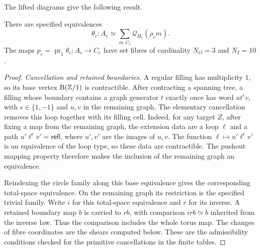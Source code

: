The lifted diagrams give the following result.
\begin{theorem}\label{thm:short-cover}
There are specified equivalences
\[
\theta_c:A_c\simeq\sum_{m:C_c}\mathcal Q_{H_c}(\rho_c m).
\]
The maps $p_c=\operatorname{pr}_1\theta_c:A_c\to C_c$ have set fibres of cardinality $N_O=3$ and $N_I=10$.
\end{theorem}
\begin{proof}
\emph{Cancellation and retained boundaries.}
A regular filling has multiplicity $1$, so its base vertex
$\mathrm B(\mathbb Z/1)$ is contractible. After contracting a spanning tree, a filling
whose boundary contains a graph generator $t$ exactly once has word
$u t^{\epsilon}v$, with $\epsilon\in\{1,-1\}$ and $u,v$ in the remaining graph.
The elementary cancellation removes this loop together with its filling cell.
Indeed, for any target $Z$, after fixing a map from the remaining graph,
the extension data are a loop $\ell$ and a path
$u'\ell^{\epsilon}v'=\mathsf{refl}$, where $u',v'$ are the images of $u,v$.
The function $\ell\mapsto u'\ell^{\epsilon}v'$ is an equivalence of the loop type,
so these data are contractible. The pushout mapping property therefore makes
the inclusion of the remaining graph an equivalence.

Reindexing the circle family along this base equivalence gives the
corresponding total-space equivalence. On the remaining graph its restriction
is the specified trivial family. Write $i$ for this total-space equivalence
and $r$ for its inverse. A retained boundary map $b$ is carried to $r b$,
with comparison $i r b\simeq b$ inherited from the inverse law. Thus the comparison includes the whole
torus map. The changes of fibre coordinates are the shears computed below.
These are the admissibility conditions checked for the primitive cancellations
in the finite tables.


\end{proof}
